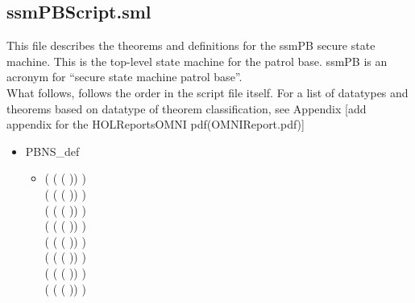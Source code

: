 \subsection{ssmPBScript.sml}
\label{sec:ssmpbscript.sml}

This file describes the theorems and definitions for the ssmPB secure state machine.
This is the top-level state machine for the patrol base. ssmPB is an acronym for “secure state machine patrol base”.\\

What follows, follows the order in the script file itself. For a list of datatypes and
theorems based on datatype of theorem classification, see Appendix [add appendix for the HOLReportsOMNI pdf(OMNIReport.pdf)]

\begin{itemize}
\item PBNS_def
  \begin{itemize}
    \item[] \HOLTokenTurnstile{} (  ( ( )) \HOLSymConst{=} ) \HOLSymConst{\HOLTokenConj{}}\ \\
   (  ( ( )) \HOLSymConst{=} ) \HOLSymConst{\HOLTokenConj{}}\ \\
   (  ( ( )) \HOLSymConst{=} ) \HOLSymConst{\HOLTokenConj{}}\ \\
   (  ( ( )) \HOLSymConst{=} ) \HOLSymConst{\HOLTokenConj{}}\ \\
   (  ( ( )) \HOLSymConst{=} ) \HOLSymConst{\HOLTokenConj{}}\ \\
   (  ( ( )) \HOLSymConst{=} ) \HOLSymConst{\HOLTokenConj{}}\ \\
   (  ( ( )) \HOLSymConst{=} ) \HOLSymConst{\HOLTokenConj{}}\ \\
   (  ( ( )) \HOLSymConst{=} ) \HOLSymConst{\HOLTokenConj{}}\ \\

\end{itemize}
\end{itemize}
